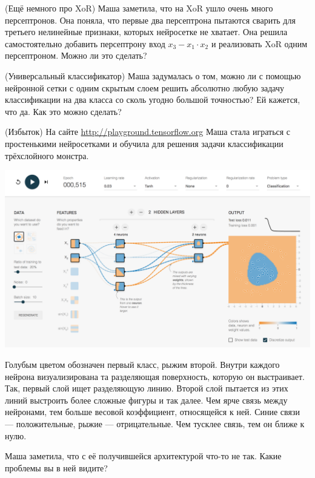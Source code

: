 \documentclass[12pt, a4paper, oneside]{article}
\theoremstyle{plain} %
\theoremstyle{definition}
\begin{document}
\begin{problem}{(Ещё немного про XoR)} 
Маша заметила, что на XoR ушло очень много персептронов. Она поняла, что первые два персептрона пытаются сварить для третьего нелинейные признаки, которых нейросетке не хватает. Она решила самостоятельно добавить персептрону вход $x_3 - x_1 \cdot x_2$ и реализовать XoR одним персептроном. Можно ли это сделать? 
\end{problem}

\begin{problem}{(Универсальный классификатор)}
Маша задумалась о том, можно ли с помощью нейронной сетки с одним скрытым слоем решить абсолютно любую задачу классификации на два класса со сколь угодно большой точностью? Ей кажется, что да. Как это можно сделать? 
\end{problem} 


\begin{problem}{(Избыток)}
На сайте \url{http://playground.tensorflow.org} Маша стала играться с простенькими нейросетками и  обучила для решения задачи классификации трёхслойного монстра.

\begin{center} 
\includegraphics[scale=0.17]{tensorflow_demo.png}
\end{center} 

Голубым цветом обозначен первый класс, рыжим второй. Внутри каждого нейрона визуализирована та разделяющая поверхность, которую он выстраивает. Так, первый слой ищет разделяющую линию. Второй слой пытается из этих линий выстроить более сложные фигуры и так далее. Чем ярче связь между нейронами, тем больше весовой коэффициент, относящейся к ней. Синие связи --- положительные, рыжие --- отрицательные. Чем тусклее связь, тем он ближе к нулю. 

Маша заметила, что с её получившейся архитектурой что-то не так. Какие проблемы вы в ней видите?
\end{problem} 
\end{document}
